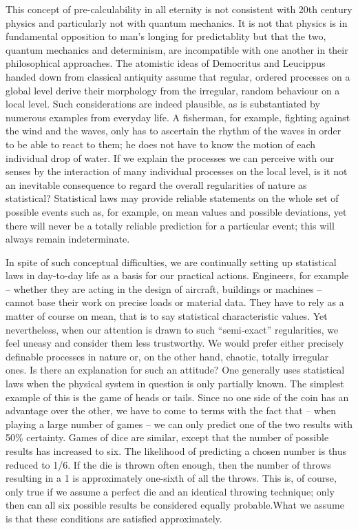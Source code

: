 \documentclass[12pt]{article}
\begin{document}
\hfill

This concept of pre-calculability in all eternity is not consistent with 20th century
physics and particularly not with quantum mechanics. It is not that physics
is in fundamental opposition to man’s longing for predictablity but that the two,
quantum mechanics and determinism, are incompatible with one another in their
philosophical approaches. The atomistic ideas of Democritus and Leucippus handed
down from classical antiquity assume that regular, ordered processes on a global
level derive their morphology from the irregular, random behaviour on a local level.
Such considerations are indeed plausible, as is substantiated by numerous examples
from everyday life. A fisherman, for example, fighting against the wind and the
waves, only has to ascertain the rhythm of the waves in order to be able to react to
them; he does not have to know the motion of each individual drop of water. If we
explain the processes we can perceive with our senses by the interaction of many
individual processes on the local level, is it not an inevitable consequence to regard
the overall regularities of nature as statistical? Statistical laws may provide reliable
statements on the whole set of possible events such as, for example, on mean values
and possible deviations, yet there will never be a totally reliable prediction for a
particular event; this will always remain indeterminate.

\hfill

In spite of such conceptual difficulties, we are continually setting up statistical laws in
day-to-day life as a basis for our practical actions. Engineers, for example – whether
they are acting in the design of aircraft, buildings or machines – cannot base their
work on precise loads or material data. They have to rely as a matter of course on
mean, that is to say statistical characteristic values. Yet nevertheless, when our attention
is drawn to such “semi-exact” regularities, we feel uneasy and consider them
less trustworthy. We would prefer either precisely definable processes in nature or,
on the other hand, chaotic, totally irregular ones. Is there an explanation for such an
attitude? One generally uses statistical laws when the physical system in question is
only partially known. The simplest example of this is the game of heads or tails. Since
no one side of the coin has an advantage over the other, we have to come to terms with
the fact that – when playing a large number of games – we can only predict one of the
two results with 50\% certainty. Games of dice are similar, except that the number of
possible results has increased to six. The likelihood of predicting a chosen number is
thus reduced to 1/6. If the die is thrown often enough, then the number of throws
resulting in a 1 is approximately one-sixth of all the throws. This is, of course, only
true if we assume a perfect die and an identical throwing technique; only then can
all six possible results be considered equally probable.What we assume is that these
conditions are satisfied approximately.
\end{document}
